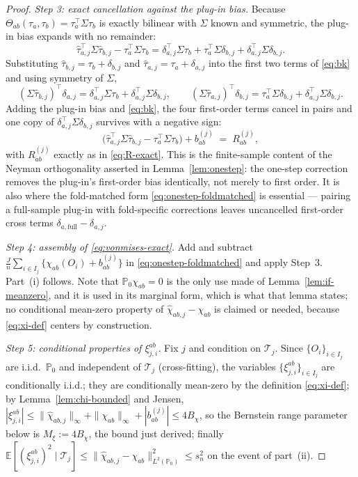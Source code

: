 \documentclass[11pt]{article}
\theoremstyle{plain}
\theoremstyle{definition}
\theoremstyle{remark}
\newcommand{\E}{\mathbb{E}}
\newcommand{\PP}{\mathbb{P}}
\begin{document}
\begin{proof}
\emph{Step 3: exact cancellation against the plug-in bias.} Because
$\Theta_{ab}(\tau_a,\tau_b)=\tau_a^\top\Sigma\tau_b$ is exactly bilinear with $\Sigma$
known and symmetric, the plug-in bias expands with no remainder:
\[
    \hat\tau_{a,j}^\top\Sigma\hat\tau_{b,j}-\tau_a^\top\Sigma\tau_b=\delta_{a,j}^\top\Sigma\tau_b+\tau_a^\top\Sigma\delta_{b,j}+\delta_{a,j}^\top\Sigma\delta_{b,j}.
\]
Substituting $\hat\tau_{b,j}=\tau_b+\delta_{b,j}$ and
$\hat\tau_{a,j}=\tau_a+\delta_{a,j}$ into the first two terms of \eqref{eq:bk} and using
symmetry of $\Sigma$,
\[
    (\Sigma\hat\tau_{b,j})^\top\delta_{a,j}=\delta_{a,j}^\top\Sigma\tau_b+\delta_{a,j}^\top\Sigma\delta_{b,j},\qquad
    (\Sigma\hat\tau_{a,j})^\top\delta_{b,j}=\tau_a^\top\Sigma\delta_{b,j}+\delta_{a,j}^\top\Sigma\delta_{b,j}.
\]
Adding the plug-in bias and \eqref{eq:bk}, the four first-order terms cancel in pairs and
one copy of $\delta_{a,j}^\top\Sigma\delta_{b,j}$ survives with a negative sign:
\[
    \big(\hat\tau_{a,j}^\top\Sigma\hat\tau_{b,j}-\tau_a^\top\Sigma\tau_b\big)+b^{(j)}_{ab}\;=\;R^{(j)}_{ab},
\]
with $R^{(j)}_{ab}$ exactly as in \eqref{eq:R-exact}. This is the finite-sample content of
the Neyman orthogonality asserted in Lemma~\ref{lem:onestep}: the one-step correction
removes the plug-in's first-order bias identically, not merely to first order. It is also
where the fold-matched form \eqref{eq:onestep-foldmatched} is essential --- pairing a
full-sample plug-in with fold-specific corrections leaves uncancelled first-order cross
terms $\delta_{a,\text{full}}-\delta_{a,j}$.

\emph{Step 4: assembly of \eqref{eq:vonmises-exact}.} Add and subtract
$\frac Jn\sum_{i\in I_j}\{\chi_{ab}(O_i)+b^{(j)}_{ab}\}$ in
\eqref{eq:onestep-foldmatched} and apply Step~3. Part~(i) follows. Note that
$\PP_0\chi_{ab}=0$ is the only use made of Lemma~\ref{lem:if-meanzero}, and it is used in
its marginal form, which is what that lemma states; no conditional mean-zero property of
$\hat\chi_{ab,j}-\chi_{ab}$ is claimed or needed, because \eqref{eq:xi-def} centers by
construction.

\emph{Step 5: conditional properties of $\xi^{ab}_{j,i}$.} Fix $j$ and condition on
$\mathcal T_j$. Since $\{O_i\}_{i\in I_j}$ are i.i.d.\ $\PP_0$ and independent of
$\mathcal T_j$ (cross-fitting), the variables $\{\xi^{ab}_{j,i}\}_{i\in I_j}$ are
conditionally i.i.d.; they are conditionally mean-zero by the definition
\eqref{eq:xi-def}; by Lemma~\ref{lem:chi-bounded} and Jensen,
$|\xi^{ab}_{j,i}|\le\|\hat\chi_{ab,j}\|_\infty+\|\chi_{ab}\|_\infty+|b^{(j)}_{ab}|\le4B_\chi$,
so the Bernstein range parameter below is $M_\xi:=4B_\chi$, the bound just derived;
finally $\E[(\xi^{ab}_{j,i})^2\mid\mathcal T_j]\le\|\hat\chi_{ab,j}-\chi_{ab}\|^2_{L^2(\PP_0)}\le s_n^2$
on the event of part~(ii).


\end{proof}
\end{document}

